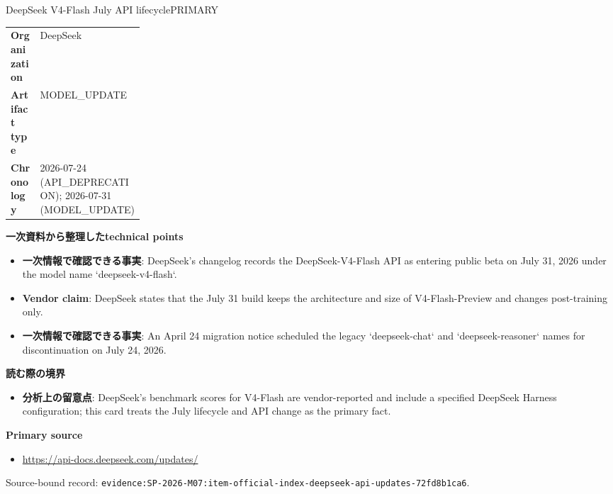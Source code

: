 \begin{technicalnote}{DeepSeek V4-Flash July API lifecycle}{PRIMARY}
\begin{tabularx}{\linewidth}{@{}>{\bfseries}p{0.22\linewidth}X@{}}
Organization & DeepSeek \\
Artifact type & MODEL\_UPDATE \\
Chronology & 2026-07-24 (API\_DEPRECATION); 2026-07-31 (MODEL\_UPDATE) \\
\end{tabularx}
\smallskip
{\bfseries 一次資料から整理したtechnical points}
\begin{itemize}[leftmargin=1.5em,itemsep=0.35em]
\item \textbf{一次情報で確認できる事実}: DeepSeek's changelog records the DeepSeek-V4-Flash API as entering public beta on July 31, 2026 under the model name `deepseek-v4-flash`.
\item \textbf{Vendor claim}: DeepSeek states that the July 31 build keeps the architecture and size of V4-Flash-Preview and changes post-training only.
\item \textbf{一次情報で確認できる事実}: An April 24 migration notice scheduled the legacy `deepseek-chat` and `deepseek-reasoner` names for discontinuation on July 24, 2026.
\end{itemize}
{\bfseries 読む際の境界}
\begin{itemize}[leftmargin=1.5em,itemsep=0.35em]
\item \textbf{分析上の留意点}: DeepSeek's benchmark scores for V4-Flash are vendor-reported and include a specified DeepSeek Harness configuration; this card treats the July lifecycle and API change as the primary fact.
\end{itemize}
{\bfseries Primary source}
\begin{itemize}[leftmargin=1.5em,itemsep=0.25em]
\item \url{https://api-docs.deepseek.com/updates/}
\end{itemize}
{\scriptsize\color{SurveyMuted}Source-bound record: \texttt{evidence:SP-2026-M07:item-official-index-deepseek-api-updates-72fd8b1ca6}.}
\end{technicalnote}
\medskip

